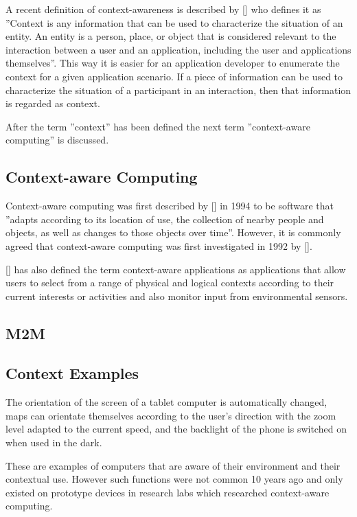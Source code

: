 A recent definition of context-awareness is described by [\citeauthor{Dey2000b}] who defines it as ''Context is any information that can be used to characterize the situation of an entity. An entity is a person, place, or object that is considered relevant to the interaction between a user and an application, including the user and applications themselves''. This way it is easier for an application developer to enumerate the context for a given application scenario. If a piece of information can be used to characterize the situation of a participant in an interaction, then that information is regarded as context.

After the term ''context'' has been defined the next term ''context-aware computing'' is discussed.

\subsection{Context-aware Computing}
Context-aware computing was first described by [\citeauthor{ieee313011}] in 1994 to be software that ''adapts according to its location of use, the collection of nearby people and objects, as well as changes to those objects over time''. However, it is commonly agreed that context-aware computing was first investigated in 1992 by [\citeauthor{WantHFG92}]. 

[\citeauthor{RyanME}] has also defined the term context-aware applications as applications that allow users to select from a range of physical and logical contexts according to their current interests or activities and also monitor input from environmental sensors.

\subsection{M2M}

\subsection{Context Examples}
The orientation of the screen of a tablet computer is automatically changed, maps can orientate themselves according to the user's direction with the zoom level adapted to the current speed, and the backlight of the phone is switched on when used in the dark.

These are examples of computers that are aware of their environment and their contextual use. However such functions were not common 10 years ago and only existed on prototype devices in research labs which researched context-aware computing.
\\

